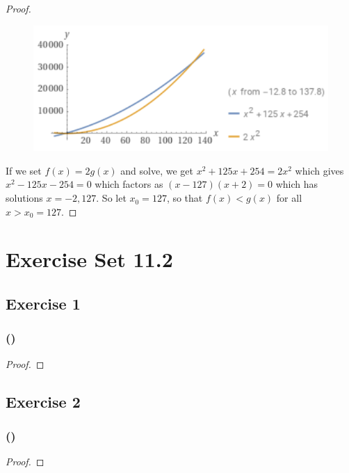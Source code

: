 \documentclass[14pt]{extarticle}
\begin{document}
\begin{proof}
\begin{figure}[ht!]
\centering
\includegraphics[scale=0.5]{../images/11.1.28.png}
\end{figure}
If we set \(f(x) = 2g(x)\) and solve, we get \(x^2 + 125x + 254 = 2x^2\) which gives \(x^2 - 125x - 254 = 0\) which 
factors as \((x-127)(x+2) = 0\) which has solutions \(x = -2, 127\). So let \(x_0 = 127\), so that \(f(x) < g(x)\) for all
\(x > x_0 = 127\).
\end{proof}

\section{Exercise Set 11.2}

\subsection{Exercise 1}

\subsubsection{()}

\begin{proof}

\end{proof}

\subsection{Exercise 2}

\subsubsection{()}

\begin{proof}

\end{proof}
\end{document}
